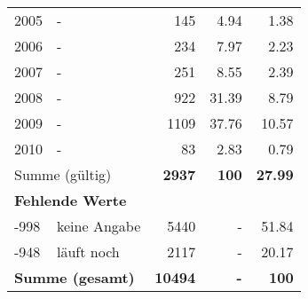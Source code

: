 \begin{longtable}{lXrrr}
     2005 &
     \multicolumn{1}{X}{ -  } &


       \num{145} &
       \num[round-mode=places,round-precision=2]{4.94} &
         \num[round-mode=places,round-precision=2]{1.38} \\

     2006 &
     \multicolumn{1}{X}{ -  } &


       \num{234} &
       \num[round-mode=places,round-precision=2]{7.97} &
         \num[round-mode=places,round-precision=2]{2.23} \\

     2007 &
     \multicolumn{1}{X}{ -  } &


       \num{251} &
       \num[round-mode=places,round-precision=2]{8.55} &
         \num[round-mode=places,round-precision=2]{2.39} \\

     2008 &
     \multicolumn{1}{X}{ -  } &


       \num{922} &
       \num[round-mode=places,round-precision=2]{31.39} &
         \num[round-mode=places,round-precision=2]{8.79} \\

     2009 &
     \multicolumn{1}{X}{ -  } &


       \num{1109} &
       \num[round-mode=places,round-precision=2]{37.76} &
         \num[round-mode=places,round-precision=2]{10.57} \\

     2010 &
     \multicolumn{1}{X}{ -  } &


       \num{83} &
       \num[round-mode=places,round-precision=2]{2.83} &
         \num[round-mode=places,round-precision=2]{0.79} \\
     \midrule
     \multicolumn{2}{l}{Summe (gültig)} &
       \textbf{\num{2937}} &
     \textbf{\num{100}} &
       \textbf{\num[round-mode=places,round-precision=2]{27.99}} \\
     \multicolumn{5}{l}{\textbf{Fehlende Werte}}\\
       -998 &
       keine Angabe &
         \num{5440} &
        - &
         \num[round-mode=places,round-precision=2]{51.84} \\
       -948 &
       läuft noch &
         \num{2117} &
        - &
         \num[round-mode=places,round-precision=2]{20.17} \\
     \midrule
     \multicolumn{2}{l}{\textbf{Summe (gesamt)}} &
          \textbf{\num{10494}} &
        \textbf{-} &
        \textbf{\num{100}} \\
     \bottomrule
     \end{longtable}
     
